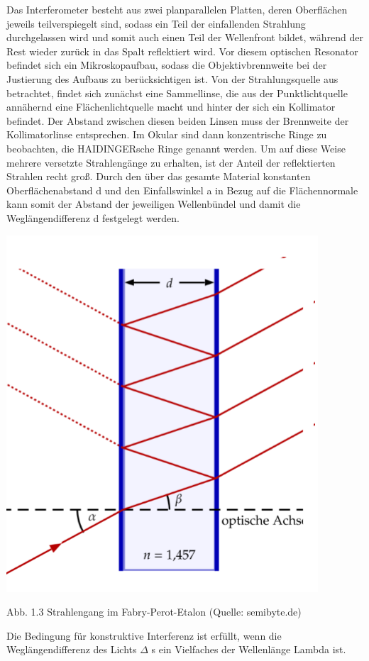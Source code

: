 \documentclass[10pt,a4paper]{article}
\begin{document}
Das Interferometer besteht aus zwei planparallelen Platten, deren Oberflächen jeweils teilverspiegelt sind, sodass ein Teil der einfallenden Strahlung durchgelassen wird und somit auch einen Teil der Wellenfront bildet, während der Rest wieder zurück in das Spalt reflektiert wird. Vor diesem optischen Resonator befindet sich ein Mikroskopaufbau, sodass die Objektivbrennweite bei der Justierung des Aufbaus zu berücksichtigen ist. Von der Strahlungsquelle aus betrachtet, findet sich zunächst eine Sammellinse, die aus der Punktlichtquelle annähernd eine Flächenlichtquelle macht und hinter der sich ein Kollimator befindet. Der Abstand zwischen diesen beiden Linsen muss der Brennweite der Kollimatorlinse entsprechen. Im Okular sind dann konzentrische Ringe zu beobachten, die HAIDINGERsche Ringe genannt werden. Um auf diese Weise mehrere versetzte Strahlengänge zu erhalten, ist der Anteil der reflektierten Strahlen recht groß. Durch den über das gesamte Material konstanten Oberflächenabstand d und den Einfallswinkel a in Bezug auf die Flächennormale kann somit der Abstand der jeweiligen Wellenbündel und damit die Weglängendifferenz d festgelegt werden.


\includegraphics{fab}

Abb. 1.3 Strahlengang im Fabry-Perot-Etalon (Quelle: semibyte.de)


Die Bedingung für konstruktive Interferenz ist erfüllt, wenn die Weglängendifferenz des Lichts $\Delta$ s ein Vielfaches der Wellenlänge Lambda ist.\\
\end{document}

